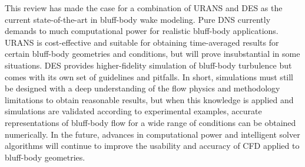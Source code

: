 \documentclass[journal]{new-aiaa}
\begin{document}
This review has made the case for a combination of URANS and DES as the current state-of-the-art in bluff-body wake modeling. Pure DNS currently demands to much computational power for realistic bluff-body applications. URANS is cost-effective and suitable for obtaining time-averaged results for certain bluff-body geometries and conditions, but will prove insubstantial in some situations. DES provides higher-fidelity simulation of bluff-body turbulence but comes with its own set of guidelines and pitfalls. In short, simulations must still be designed with a deep understanding of the flow physics and methodology limitations to obtain reasonable results, but when this knowledge is applied and simulations are validated according to experimental examples, accurate representations of bluff-body flow for a wide range of conditions can be obtained numerically. In the future, advances in computational power and intelligent solver algorithms will continue to improve the usability and accuracy of CFD applied to bluff-body geometries.




\clearpage






\end{document}
